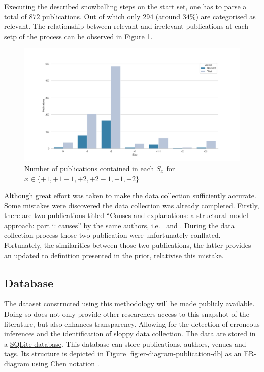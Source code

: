 \documentclass[11pt,a4paper]{book}
\theoremstyle{definition}
\theoremstyle{definition}
\theoremstyle{definition}
\theoremstyle{remark}
\newcommand{\pset}{S}
\begin{document}
Executing the described snowballing steps on the start set, one has to parse a total of $872$ publications. Out of which only $294$ (around $34 \%$) are categorised as relevant. The relationship between relevant and irrelevant publications at each setp of the process can be observed in Figure \ref{fig:pgraph-relevant_publications_per_step}.


\begin{figure}[h!]
\includegraphics[width=\textwidth]{relevant_publications_per_step.png}
\caption{Number of publications contained in each $\pset_x$ for $x \in \{ \mathit{+1}, \mathit{+1-1}, \mathit{+2}, \mathit{+2-1}, \mathit{-1}, \mathit{-2}\}$}
\label{fig:pgraph-relevant_publications_per_step}
\end{figure}


Although great effort was taken to make the data collection sufficiently accurate. Some mistakes were discovered the data collection was already completed.
Firstly, there are two publications titled ``Causes and explanations: a structural-model approach: part i: causes'' by the same authors, i.e.\ \parencite{halpern2001causes} and \parencite{halpern2005causes}.
During the data collection process those two publication were unfortunately conflated. Fortunately, the similarities between those two publications, the latter provides an updated to definition presented in the prior, relativise this mistake.

\subsection{Database}
\label{subsec:database}
The dataset constructed using this methodology will be made publicly available. Doing so does not only provide other researchers access to this snapshot of the literature, but also enhances transparency. Allowing for the detection of erroneous inferences and the identification of sloppy data collection. The data are stored in a \href{https://www.sqlite.org/index.html}{SQLite-database}. This database can store publications, authors, venues and tags. Its structure is depicted in Figure \ref{fig:er-diagram-publication-db} as an ER-diagram using Chen notation \parencite{chen1976entity}.
\end{document}
